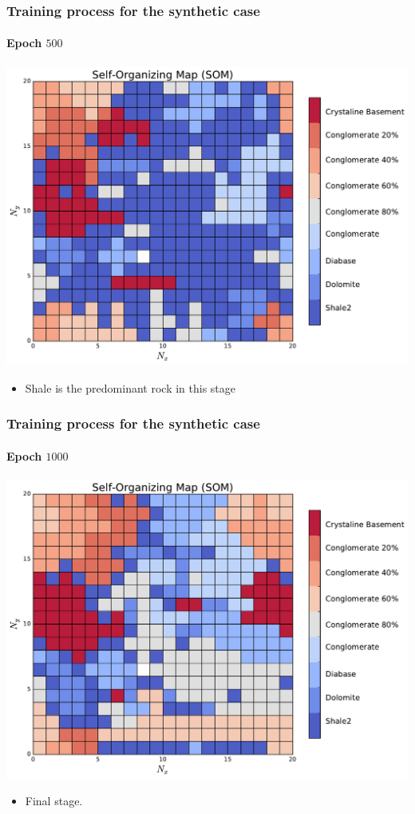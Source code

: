 \documentclass[aspectratio=10]{beamer} %
\begin{document}
\begin{frame}
\frametitle{Training process for the synthetic case}
\framesubtitle{Epoch $500$}
\centering
\includegraphics[scale=0.3]{Imagens/SOM100.pdf} 
\pause
\begin{itemize}
	\footnotesize
	\item Shale is the predominant rock in this stage
\end{itemize}
\end{frame}

\begin{frame}
\frametitle{Training process for the synthetic case}
\framesubtitle{Epoch $1000$}
\centering
\includegraphics[scale=0.3]{Imagens/SOM1000.pdf} 
\pause
\begin{itemize}
	\footnotesize
	\item Final stage.
\end{itemize}
\end{frame}
\end{document}
